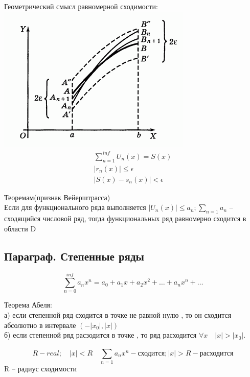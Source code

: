 \documentclass[a4paper, 12pt]{article}
\begin{document}
Геометрический смысл равномерной сходимости:\\
\includegraphics{img/551.png}\\
\begin{align*}
  \sum_{n=1}^{inf} U_n(x) = S(x)\\
  |r_n(x)| \leq \epsilon\\
  |S(x) - s_n(x) | < \epsilon 
\end{align*}
\newpage
\begin{mdframed}[backgroundcolor=green!40] 
       Теоремам(признак Вейерштрасса)\\
       Если для функционального ряда выполняется $ |U_n(x)| \leq a_n; \sum_{n=1}^{} a_n  $ -- сходящийся числовой ряд, тогда функциональных ряд равномерно сходится в области D  
    \end{mdframed}
    
\subsection{Параграф. Степенные ряды}
\[
  \sum_{n=0}^{inf} a_nx^n = a_0 + a_1x +  a_2 x^2 + \ldots+ a_nx^n + \ldots
\]
\begin{mdframed}[backgroundcolor=red!40] 
       Теорема Абеля:\\
       а) если степенной ряд сходится в точке не равной нулю , то он сходится абсолютно в интервале $ (-|x_0| , |x|) $ \\
       б) если степенной ряд расзодится в точке , то ряд расходится $ \forall x \quad  |x| > |x_0|.  $ 
    \end{mdframed}
    
\[
  R - real; \quad |x| < R \quad \sum_{n=1}^{} a_nx^n -\text{сходится}; |x| > R -\text{расходится}
\]
R -- радиус сходимости
\end{document}
